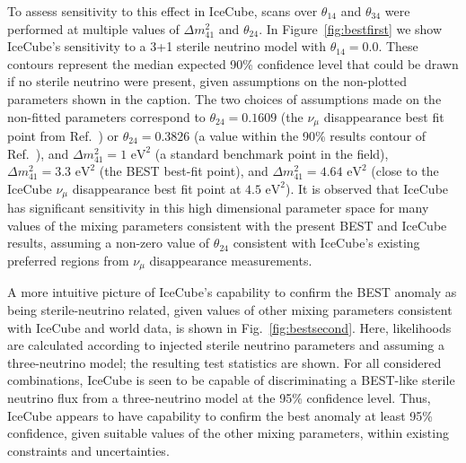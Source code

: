 \documentclass[main.tex]{subfiles}
\begin{document}
To assess sensitivity to this effect in IceCube, scans over $\theta_{14}$ and $\theta_{34}$ were performed at multiple values of $\Delta m_{41}^{2}$ and $\theta_{24}$. 
In Figure~\ref{fig:bestfirst} we show IceCube's sensitivity to a 3+1 sterile neutrino model with $\theta_{14}=0.0$. These contours represent the median expected 90\% confidence level that could be drawn if no sterile neutrino were present, given assumptions on the non-plotted parameters shown in the caption.  The two choices of assumptions made on the non-fitted parameters correspond to $\theta_{24}=0.1609$ (the $\nu_\mu$ disappearance best fit point from Ref.~\cite{Aartsen_2020}) or $\theta_{24}=0.3826$ (a value within the 90\% results contour of Ref.~\cite{Aartsen_2020}), and $\Delta m^2_{41}=1\text{ eV}^2$ (a standard benchmark point in the field), $\Delta m^2_{41}=3.3\text{ eV}^2$ (the BEST best-fit point), and $\Delta m^2_{41}=4.64\text{ eV}^2$ (close to the IceCube $\nu_\mu$ disappearance best fit point at $4.5\text{ eV}^2$).  It is observed that IceCube has significant sensitivity in this high dimensional parameter space for many values of the mixing parameters consistent with the present BEST and IceCube results, assuming a non-zero value of $\theta_{24}$ consistent with IceCube's existing preferred regions from $\nu_\mu$ disappearance measurements.

A more intuitive picture of IceCube's capability to confirm the BEST anomaly as being sterile-neutrino related, given values of other mixing parameters consistent with IceCube and world data, is shown in Fig.~\ref{fig:bestsecond}. Here, likelihoods are calculated according to injected sterile neutrino parameters and assuming a three-neutrino model; the resulting test statistics are shown. For all considered combinations, IceCube is seen to be capable of discriminating a BEST-like sterile neutrino flux from a three-neutrino model at the 95\% confidence level. Thus, IceCube appears to have capability to confirm the best anomaly at least 95\% confidence, given suitable values of the other mixing parameters, within existing constraints and uncertainties.
\end{document}
